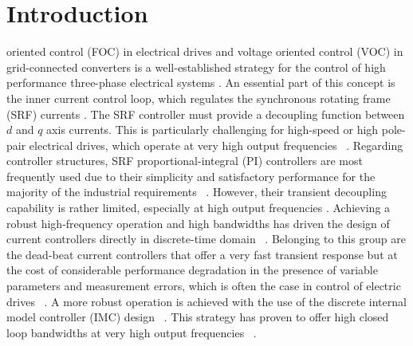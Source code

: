 \documentclass[conference]{IEEEtran}
\begin{document}
\section{Introduction}
 oriented control (FOC) in electrical drives and voltage oriented control (VOC) in grid-connected converters is a well-established strategy for the control of high performance three-phase electrical systems \cite{holmes2012}. An essential part of this concept is the inner current control loop, which regulates the synchronous rotating frame (SRF) currents \cite{holmes2012}. The SRF controller must provide a decoupling function between $d$ and $q$ axis currents. This is particularly challenging for high-speed or high pole-pair electrical drives, which operate at very high output frequencies ~\cite{yim2009,Petric2021a}. 
Regarding controller structures, SRF proportional-integral (PI) controllers are most frequently used due to their simplicity and satisfactory performance for the majority of the industrial requirements ~\cite{yim2009,yepes2014}. However, their transient decoupling capability is rather limited, especially at high output frequencies \cite{lorenz2010}. Achieving a robust high-frequency operation and high bandwidths has driven the design of current controllers directly in discrete-time domain ~\cite{lorenz2010,vuksa2016,commentsHoffmann}. Belonging to this group are the dead-beat current controllers that offer a very fast transient response but at the cost of considerable performance degradation in the presence of variable parameters and measurement errors, which is often the case in control of electric drives ~\cite{rovere2018,xu2019,Ito2021}. A more robust operation is achieved with the use of the discrete internal model controller (IMC) design ~\cite{lorenz2010,vuksa2016,commentsHoffmann}. This strategy has proven to offer high closed loop bandwidths at very high output frequencies ~\cite{commentsHoffmann,vuksa2016,Petric2021a}.
\end{document}
